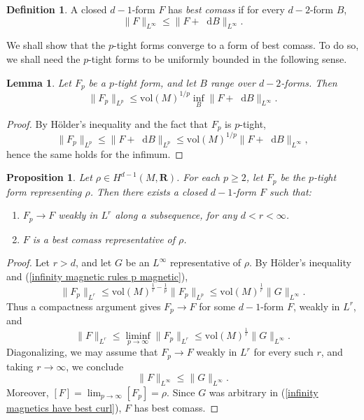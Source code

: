 \documentclass[reqno,11pt]{amsart}
\newcommand{\RR}{\mathbf{R}}
\newcommand*\dif{\mathop{}\!\mathrm{d}}
\newcommand{\vol}{\mathrm{vol}}
\newcommand{\dfn}[1]{\emph{#1}\index{#1}}
\newtheorem{lemma}[theorem]{Lemma}
\newtheorem{proposition}[theorem]{Proposition}
\theoremstyle{definition}
\newtheorem{definition}[theorem]{Definition}
\numberwithin{equation}{section}
\begin{document}
\begin{definition}
A closed $d - 1$-form $F$ has \dfn{best comass} if for every $d - 2$-form $B$,
$$\|F\|_{L^\infty} \leq \|F + \dif B\|_{L^\infty}.$$
\end{definition}

We shall show that the $p$-tight forms converge to a form of best comass.
To do so, we shall need the $p$-tight forms to be uniformly bounded in the following sense.

\begin{lemma}
Let $F_p$ be a $p$-tight form, and let $B$ range over $d - 2$-forms. Then
\begin{equation}\label{infinity magnetic rules p magnetic}
	\|F_p\|_{L^p} \leq \vol(M)^{1/p} \inf_B \|F + \dif B\|_{L^\infty}.
\end{equation}
\end{lemma}
\begin{proof}
By H\"older's inequality and the fact that $F_p$ is $p$-tight,
$$\|F_p\|_{L^p} \leq \|F + \dif B\|_{L^p} \leq \vol(M)^{1/p} \|F + \dif B\|_{L^\infty},$$
hence the same holds for the infimum.
\end{proof}

\begin{proposition}\label{existence infinity}
Let $\rho \in H^{d - 1}(M, \RR)$.
For each $p \geq 2$, let $F_p$ be the $p$-tight form representing $\rho$. Then there exists a closed $d - 1$-form $F$ such that:
\begin{enumerate}
\item $F_p \to F$ weakly in $L^r$ along a subsequence, for any $d < r < \infty$.
\item $F$ is a best comass representative of $\rho$.
\end{enumerate}
\end{proposition}
\begin{proof}
Let $r > d$, and let $G$ be an $L^\infty$ representative of $\rho$.
By H\"older's inequality and (\ref{infinity magnetic rules p magnetic}),
\begin{equation}\label{uniform bounds in p by best curl}
	\|F_p\|_{L^r} \leq \vol(M)^{\frac{1}{r} - \frac{1}{p}} \|F_p\|_{L^p} \leq \vol(M)^{\frac{1}{r}} \|G\|_{L^\infty}.
\end{equation}
Thus a compactness argument gives $F_p \to F$ for some $d - 1$-form $F$, weakly in $L^r$, and 
$$\|F\|_{L^r} \leq \liminf_{p \to \infty} \|F_p\|_{L^r} \leq \vol(M)^{\frac{1}{r}} \|G\|_{L^\infty}.$$
Diagonalizing, we may assume that $F_p \to F$ weakly in $L^r$ for every such $r$, and taking $r \to \infty$, we conclude 
\begin{equation}\label{infinity magnetics have best curl}
	\|F\|_{L^\infty} \leq \|G\|_{L^\infty}.
\end{equation}
Moreover, $[F] = \lim_{p \to \infty} [F_p] = \rho$.
Since $G$ was arbitrary in (\ref{infinity magnetics have best curl}), $F$ has best comass.
\end{proof}
\end{document}
